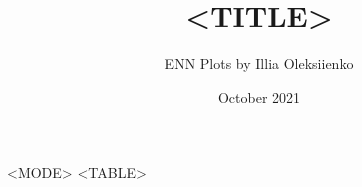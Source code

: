 \documentclass{article}
\title{<TITLE>}
\author{ENN Plots by Illia Oleksiienko}
\date{October 2021}
\begin{document}
\maketitle

\begin{center}
    \begin{table}[!ht]
    \caption{<CAPTION>}
    \centering
    \begin{tabular}{<MODE>}
    <TABLE>
    \end{tabular}
\end{table}
\end{center}
\end{document}
